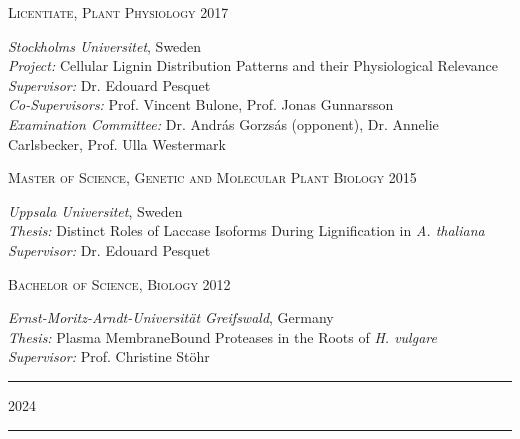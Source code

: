 \documentclass[11pt]{article}
\newcommand*{\xdash}[1][3em]{\rule[0.5ex]{#1}{0.55pt}}
\begin{document}
\begin{addmargin}[15pt]{0pt}
\textsc{\large{Licentiate, Plant Physiology} \hfill \textsc{2017}}
\end{addmargin}
\begin{addmargin}[24pt]{0pt}
	\textit{Stockholms Universitet}, Sweden \\
	\textit{Project:} Cellular Lignin Distribution Patterns and their Physiological Relevance \\
	\textit{Supervisor:} Dr. Edouard Pesquet \\
	\textit{Co-Supervisors:} Prof. Vincent Bulone, Prof. Jonas Gunnarsson\\
	\textit{Examination Committee:} Dr. András Gorzsás (opponent), Dr. Annelie Carlsbecker, Prof. Ulla Westermark
\end{addmargin}
\vspace{0.2cm}

\begin{addmargin}[15pt]{0pt}
\textsc{\large{Master of Science, Genetic and Molecular Plant Biology} \hfill \textsc{2015}}
\end{addmargin}
\begin{addmargin}[24pt]{0pt}
	\textit{Uppsala Universitet}, Sweden \\
	\textit{Thesis:} Distinct Roles of Laccase Isoforms During Lignification in \textit{ A. thaliana}\\
	\textit{Supervisor:} Dr. Edouard Pesquet
\end{addmargin}
\vspace{0.2cm}

\begin{addmargin}[15pt]{0pt}
\textsc{\large{Bachelor of Science, Biology} \hfill \textsc{2012}}
\end{addmargin}
\begin{addmargin}[24pt]{0pt}
	\textit{Ernst-Moritz-Arndt-Universität Greifswald}, Germany \\
	\textit{Thesis:} Plasma Membrane\textendash Bound Proteases in the Roots of \textit{H. vulgare}\\
	\textit{Supervisor:} Prof. Christine Stöhr
\end{addmargin}
\vspace{0.5cm}

\newpage


\hspace*{\fill} \xdash[6em] \large{\textsc{2024}} \xdash[6em] \hspace*{\fill} \normalsize
\end{document}
